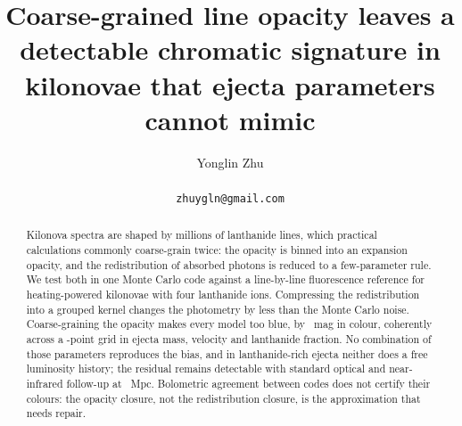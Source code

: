 \documentclass[11pt]{article}
\title{Coarse-grained line opacity leaves a detectable chromatic signature in kilonovae that ejecta parameters cannot mimic}
\author{Yonglin Zhu\\[2pt]
  \small \todo{affiliation}\\
  \small \texttt{zhuygln@gmail.com}}
\date{}
\begin{document}
\maketitle

\begin{center}
\end{center}

\begin{abstract}
Kilonova spectra are shaped by millions of lanthanide lines, which practical calculations commonly coarse-grain twice: the opacity is binned into an expansion opacity, and the redistribution of absorbed photons is reduced to a few-parameter rule. We test both in one Monte Carlo code against a line-by-line fluorescence reference for heating-powered kilonovae with four lanthanide ions. Compressing the redistribution into a grouped kernel changes the photometry by less than the Monte Carlo noise. Coarse-graining the opacity makes every model too blue, by \HeadlineColourRange\ mag in colour, coherently across a \nPoints-point grid in ejecta mass, velocity and lanthanide fraction. No combination of those parameters reproduces the bias, and in lanthanide-rich ejecta neither does a free luminosity history; the residual remains detectable with standard optical and near-infrared follow-up at \Distance\ Mpc. Bolometric agreement between codes does not certify their colours: the opacity closure, not the redistribution closure, is the approximation that needs repair.
\end{abstract}
\end{document}
